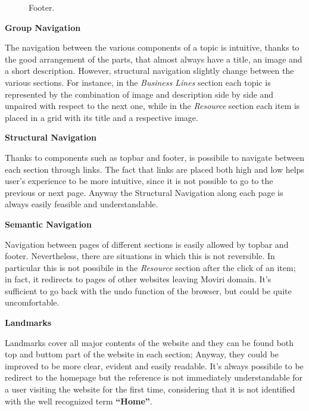 \begin{figure}[H]
  \centering
  \caption{Footer.}
   \label{Footer}
\end{figure}
\medskip
\textbf{Group Navigation}\par
The navigation between the various components of a topic is intuitive, thanks to the good arrangement of the parts, that almost always have a title, an image and a short description. However, structural navigation slightly change between the various sections. For instance, in the \textit{Business Lines} section each topic is represented by the combination of image and description side by side and unpaired with respect to the next one, while in the \textit{Resource} section each item is placed in a grid with its title and a respective image.
\medskip

\textbf{Structural Navigation}\par
Thanks to components such as topbar and footer, is possibile to navigate between each section through links. The fact that links are placed both high and low helps user’s experience to be more intuitive, since it is not possible to go to the previous or next page. Anyway the Structural Navigation along each page is always easily feasible and understandable.
\medskip

\textbf{Semantic Navigation}\par
Navigation between pages of different sections is easily allowed by topbar and footer. Nevertheless, there are situations in which this is not reversible. In particular this is not possibile in the \textit{Resource} section after the click of an item; in fact, it redirects to pages of other websites leaving Moviri domain. It's sufficient to go back with the undo function of the browser, but could be quite uncomfortable.
\medskip

\textbf{Landmarks}\par
Landmarks cover all major contents of the website and they can be found both top and buttom part of the website in each section; Anyway, they could be improved to be more clear, evident and easily readable. It’s always possibile to be redirect to the homepage but the reference is not immediately understandable for a user visiting the website for the first time, considering that it is not identified with the well recognized term \textbf{“Home”}.


